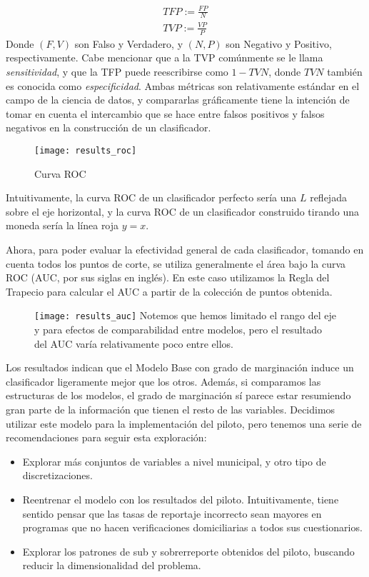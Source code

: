 \begin{align*}
    TFP := \frac{FP}{N} \\
    TVP := \frac{VP}{P}
\end{align*}
Donde $(F,V)$ son Falso y Verdadero, y $(N,P)$ son Negativo y Positivo, respectivamente. Cabe mencionar que a la TVP comúnmente se le llama \textit{sensitividad}, y que la TFP puede reescribirse como $1-TVN$, donde $TVN$ también es conocida como \textit{especificidad}. Ambas métricas son relativamente estándar en el campo de la ciencia de datos, y compararlas gráficamente tiene la intención de tomar en cuenta el intercambio que se hace entre falsos positivos y falsos negativos en la construcción de un clasificador.
\par
\noindent
\begin{figure}[H]
    \caption{Curva ROC}
    \texttt{[image: results\_roc]}
\end{figure}
Intuitivamente, la curva ROC de un clasificador perfecto sería una $L$ reflejada sobre el eje horizontal, y la curva ROC de un clasificador construido tirando una moneda sería la línea roja $y=x$.
\par
\noindent
Ahora, para poder evaluar la efectividad general de cada clasificador, tomando en cuenta todos los puntos de corte, se utiliza generalmente el área bajo la curva ROC (AUC, por sus siglas en inglés). En este caso utilizamos la Regla del Trapecio para calcular el AUC a partir de la colección de puntos obtenida.
\begin{figure}[H]
    \texttt{[image: results\_auc]}
    \footnotesize{Notemos que hemos limitado el rango del eje y para efectos de comparabilidad entre modelos, pero el resultado del AUC varía relativamente poco entre ellos.}
\end{figure}
Los resultados indican que el Modelo Base con grado de marginación induce un clasificador ligeramente mejor que los otros. Además, si comparamos las estructuras de los modelos, el grado de marginación sí parece estar resumiendo gran parte de la información que tienen el resto de las variables. Decidimos utilizar este modelo para la implementación del piloto, pero tenemos una serie de recomendaciones para seguir esta exploración:
\begin{itemize}
    \item Explorar más conjuntos de variables a nivel municipal, y otro tipo de discretizaciones.
    \item Reentrenar el modelo con los resultados del piloto. Intuitivamente, tiene sentido pensar que las tasas de reportaje incorrecto sean mayores en programas que no hacen verificaciones domiciliarias a todos sus cuestionarios.
    \item Explorar los patrones de sub y sobrerreporte obtenidos del piloto, buscando reducir la dimensionalidad del problema.
\end{itemize}
